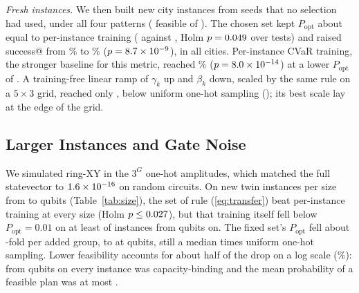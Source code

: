 \documentclass[conference]{IEEEtran}
\begin{document}
\textit{Fresh instances.} We then built new city instances from seeds that no selection had used, under all four patterns (\FrN{} feasible of \FrTried). The chosen set kept $P_{\mathrm{opt}}$ about equal to per-instance training (\FrSetOpt{} against \FrTrainedOpt, Holm $p=0.049$ over \FrFamily{} tests) and raised success@\Shots{} from \FrTrainedSucc\% to \FrSetSucc\% ($p=8.7\times10^{-9}$), in all \FrCities{} cities. Per-instance CVaR training, the stronger baseline for this metric, reached \FrCvarSucc\% ($p=8.0\times10^{-14}$) at a lower $P_{\mathrm{opt}}$ of \FrCvarOpt. A training-free linear ramp of $\gamma_k$ up and $\beta_k$ down, scaled by the same rule on a $5\times3$ grid, reached only \FrRampOpt, below uniform one-hot sampling (\FrUniOpt); its best scale lay at the edge of the grid.

\subsection{Larger Instances and Gate Noise}
We simulated ring-XY in the $3^G$ one-hot amplitudes, which matched the full statevector to $1.6\times10^{-16}$ on \SubCheckRuns{} random circuits. On \ScN{} new twin instances per size from \ScQubitsMin{} to \ScQubitsMax{} qubits (Table~\ref{tab:size}), the set of rule (\ref{eq:transfer}) beat per-instance training at every size (Holm $p\le0.027$), but that training itself fell below $P_{\mathrm{opt}}=0.01$ on at least \ScBigTrainedLowMin{} of \ScN{} instances from \ScBigQ{} qubits on. The fixed set's $P_{\mathrm{opt}}$ fell about \ScDecay-fold per added group, to \ScNineO{} at \ScQubitsMax{} qubits, still a median \ScNineOGain{} times uniform one-hot sampling. Lower feasibility accounts for about half of the drop on a log scale (\ScFeasShare\%): from \ScBindAllFromQ{} qubits on every instance was capacity-binding and the mean probability of a feasible plan was at most \ScFeasMaxBig.
\end{document}
